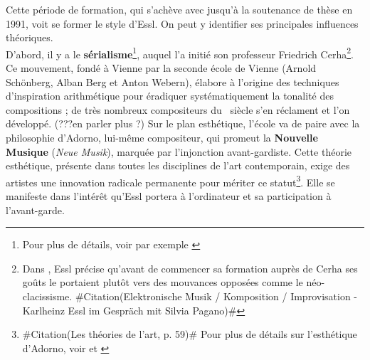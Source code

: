 \documentclass[a4paper,12pt]{article}
\newcommand{\zitat}[2]{\#Citation(#2)\#}
\begin{document}
Cette période de formation, qui s'achève avec jusqu'à la soutenance de thèse en 1991, voit se former le style d'Essl. On peut y identifier ses principales influences théoriques. \\
D'abord, il y a le \textbf{sérialisme}\footnote{Pour plus de détails, voir par exemple \cite{WODON !!!}}, auquel l'a initié son professeur Friedrich Cerha\footnote{Dans \cite{???}, Essl précise qu'avant de commencer sa formation auprès de Cerha ses goûts le portaient plutôt vers des mouvances opposées comme le néo-clacissisme. \zitat{Ich war damals ein junger Student, habe bei Friedrich Cerha Komposition studiert und steckte in einer massiven Krise, weil ich eigentlich von einer anderen Kompositionsauffassung herkam: Hindemith, Genzmer, Neoklassizismus waren damals für mich wichtig.}
{Elektronische Musik / Komposition / Improvisation - Karlheinz Essl im Gespräch mit Silvia Pagano}}. Ce mouvement, fondé à Vienne par la seconde école de Vienne (Arnold Schönberg, Alban Berg et Anton Webern), élabore à l'origine des techniques d'inspiration arithmétique pour éradiquer systématiquement la tonalité des compositions ; de très nombreux compositeurs du \XXe~siècle s'en réclament et l'on développé. (???en parler plus ?) Sur le plan esthétique, l'école va de paire avec la philosophie d'Adorno, lui-même compositeur, qui promeut la \textbf{Nouvelle Musique} (\emph{Neue Musik}), marquée par l'injonction avant-gardiste. Cette théorie esthétique, présente dans toutes les disciplines de l'art contemporain, exige des artistes une innovation radicale permanente pour mériter ce statut\footnote{\zitat{Le paradigme adornien d'une négativité en acte dans l'œuvre d'art se lit comme une injonction pour l'art moderne, et en partie pour l'art contemporain, d'avoir à intégrer l'action impérative de l'avant-garde. L'art se doit d'être critique --- traduisons : avant-gardiste --- et cet impératif s'ajoute à ceux déjà institués par les fondations précédentes.}
{Les théories de l'art, p. 59} Pour plus de détails sur l'esthétique d'Adorno, voir \cite{ESTHÉTIQUE} et \cite{adorno1949philosophie}}. Elle se manifeste dans l'intérêt qu'Essl portera à l'ordinateur et sa participation à l'avant-garde. \\
\end{document}
